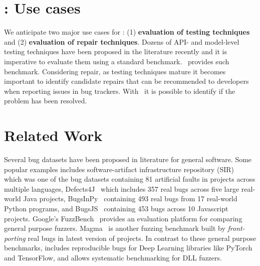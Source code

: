 \documentclass[sigconf,screen]{acmart}
\begin{document}
\section{\tname: Use cases}

We anticipate two major use cases for \tname: (1) \textbf{evaluation
  of testing techniques} and (2) \textbf{evaluation of repair
  techniques}. Dozens of API- and model-level testing techniques have
been proposed in the literature recently and it is imperative to
evaluate them using a standard benchmark. \tname\ provides such
benchmark. Considering repair, as testing techniques mature it becomes
important to identify candidate repairs that can be recommended to
developers when reporting issues in bug trackers. With \tname\ it is
possible to identify if the problem has been resolved. 

\section{Related Work} 

Several bug datasets have been proposed in literature for general
software. Some popular examples includes software-artifact
infrastructure repository (SIR)~\cite{do2005supporting} which was one
of the bug datasets containing 81 artificial faults in projects across
multiple languages, Defects4J~\cite{just2014defects4j} which includes
357 real bugs across five large real-world Java projects,
BugsInPy~\cite{widyasari2020bugsinpy} containing 493 real bugs from 17
real-world Python programs, and BugsJS~\cite{vancsics2020relationship}
containing 453 bugs across 10 Javascript projects.
%
Google's FuzzBench~\cite{metzman2021fuzzbench} provides an evaluation platform
for comparing general purpose fuzzers. Magma~\cite{hazimeh2020magma} is another
fuzzing benchmark built by \emph{front-porting} real bugs in latest version of
projects. In contrast to these general purpose benchmarks, \tname includes
reproducible bugs for Deep Learning libraries like PyTorch and TensorFlow, and
allows systematic benchmarking for DLL fuzzers. 

\end{document}
